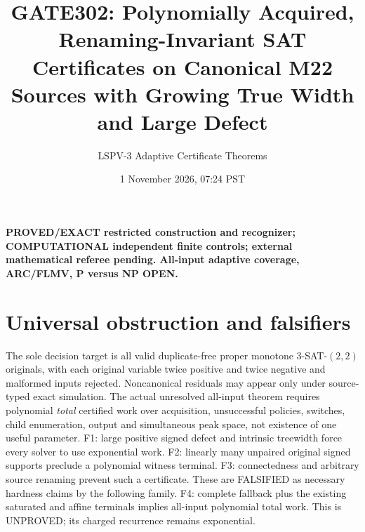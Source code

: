 \documentclass[11pt]{article}
\title{GATE302: Polynomially Acquired, Renaming-Invariant SAT Certificates on Canonical M22 Sources with Growing True Width and Large Defect}
\author{LSPV-3 Adaptive Certificate Theorems}
\date{1 November 2026, 07:24 PST}
\begin{document}
\maketitle
\noindent\textbf{PROVED/EXACT restricted construction and recognizer; COMPUTATIONAL independent finite controls; external mathematical referee pending. All-input adaptive coverage, ARC/FLMV, P versus NP OPEN.}
\section*{Universal obstruction and falsifiers}
The sole decision target is all valid duplicate-free proper monotone $3$-SAT-$(2,2)$ originals, with each original variable twice positive and twice negative and malformed inputs rejected. Noncanonical residuals may appear only under source-typed exact simulation. The actual unresolved all-input theorem requires polynomial \emph{total} certified work over acquisition, unsuccessful policies, switches, child enumeration, output and simultaneous peak space, not existence of one useful parameter.
F1: large positive signed defect and intrinsic treewidth force every solver to use exponential work. F2: linearly many unpaired original signed supports preclude a polynomial witness terminal. F3: connectedness and arbitrary source renaming prevent such a certificate. These are FALSIFIED as necessary hardness claims by the following family. F4: complete fallback plus the existing saturated and affine terminals implies all-input polynomial total work. This is UNPROVED; its charged recurrence remains exponential.
\end{document}
